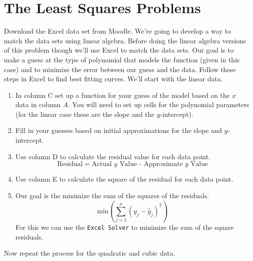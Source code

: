 \section{The Least Squares Problems}
\begin{problem}
    Download the Excel data set from Moodle.  We're going to develop a way to match the
    data sets using linear algebra.  Before doing the linear algebra versions of this
    problem though we'll use Excel to match the data sets.  Our goal is to make a guess at
    the type of polynomial that models the function (given in this case) and to minimize
    the error between our guess and the data.  Follow these steps in Excel to find best
    fitting curves.  We'll start with the linear data.
    \begin{enumerate}
        \item In column C set up a function for your guess of the model based on the $x$ data in column
            $A$.  You will need to set up cells for the polynomial parameters (for the
            linear case these are the slope and the $y$-intercept).
        \item Fill in your guesses based on initial approximations for the slope and
            $y$-intercept.
        \item Use column D to calculate the residual value for each data point.
            \[ \text{Residual} = \text{Actual $y$ Value - Approximate $y$ Value} \]
        \item Use column E to calculate the square of the residual for each data point.
        \item Our goal is the minimize the sum of the squares of the residuals.
            \[ \text{min} \left( \sum_{j=1}^n \left( y_j - \hat{y}_j \right)^2 \right) \]
            For this we can use the \texttt{Excel Solver} to minimize the sum of the
            square residuals.
    \end{enumerate}
    Now repeat the process for the quadratic and cubic data.
\end{problem}



